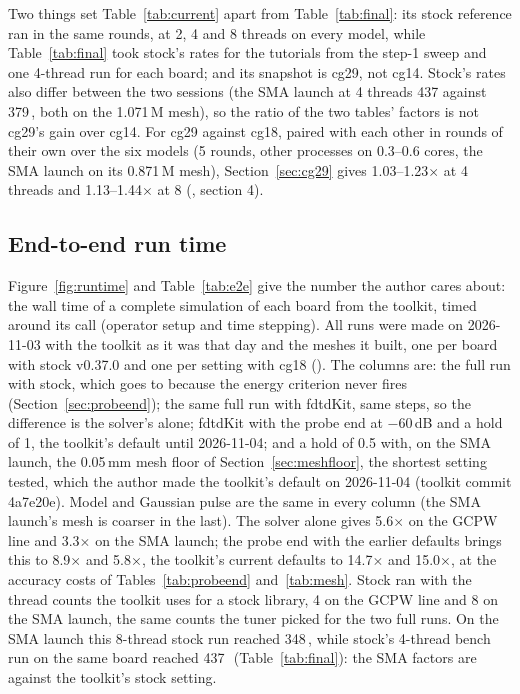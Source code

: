 Two things set Table~\ref{tab:current} apart from Table~\ref{tab:final}: its stock reference ran in the same rounds,
at 2, 4 and 8 threads on every model, while Table~\ref{tab:final} took stock's rates for the tutorials from the
step-1 sweep and one 4-thread run for each board; and its snapshot is cg29, not cg14. Stock's rates also differ
between the two sessions (the SMA launch at 4 threads 437 against 379\,\MC, both on the 1.071\,M mesh), so the ratio
of the two tables' factors is not cg29's gain over cg14. For cg29 against cg18, paired with each other in rounds of
their own over the six models (5 rounds, other processes on 0.3--0.6 cores, the SMA launch on its 0.871\,M mesh),
Section~\ref{sec:cg29} gives 1.03--1.23$\times$ at 4 threads and 1.13--1.44$\times$ at 8
(, section 4).



\subsection{End-to-end run time}
Figure~\ref{fig:runtime} and Table~\ref{tab:e2e} give the number the author cares about: the wall time of a complete
simulation of each board from the toolkit, timed around its  call (operator setup and time stepping).
All runs were made on 2026-11-03 with the toolkit as it was that day and the meshes it built, one per board with
stock v0.37.0 and one per setting with cg18 (). The columns are:
the full run with stock, which goes to  because the energy criterion never fires
(Section~\ref{sec:probeend}); the same full run with fdtdKit, same steps, so the difference is the solver's alone;
fdtdKit with the probe end at $-60$\,dB and a hold of 1, the toolkit's default until 2026-11-04; and a hold of 0.5
with, on the SMA launch, the 0.05\,mm mesh floor of
Section~\ref{sec:meshfloor}, the shortest setting tested, which the author made the toolkit's default on 2026-11-04
(toolkit commit 4a7e20e). Model and Gaussian pulse are
the same in every column (the SMA launch's mesh is coarser in the last). The solver alone gives 5.6$\times$ on the
GCPW line and 3.3$\times$ on the SMA launch; the probe end with the earlier defaults brings this to 8.9$\times$ and
5.8$\times$, the toolkit's current defaults to 14.7$\times$ and 15.0$\times$, at the accuracy costs of
Tables~\ref{tab:probeend} and~\ref{tab:mesh}. Stock ran with the thread counts the toolkit uses
for a stock library, 4 on the GCPW line and 8 on the SMA launch, the same counts the tuner picked for the two full
runs. On the SMA launch this 8-thread stock run reached 348\,\MC, while stock's 4-thread bench run on the same board
reached 437\,\MC\ (Table~\ref{tab:final}): the SMA factors are against the toolkit's stock setting.

